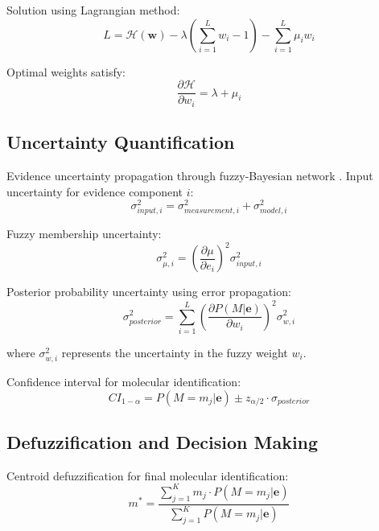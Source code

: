 \documentclass[12pt,a4paper]{article}
\begin{document}
Solution using Lagrangian method:
\begin{equation}
L = \mathcal{H}(\mathbf{w}) - \lambda \left(\sum_{i=1}^L w_i - 1\right) - \sum_{i=1}^L \mu_i w_i
\end{equation}

Optimal weights satisfy:
\begin{equation}
\frac{\partial \mathcal{H}}{\partial w_i} = \lambda + \mu_i
\end{equation}

\subsection{Uncertainty Quantification}

Evidence uncertainty propagation through fuzzy-Bayesian network \cite{klir1995fuzzy}. Input uncertainty for evidence component $i$:
\begin{equation}
\sigma_{input,i}^2 = \sigma_{measurement,i}^2 + \sigma_{model,i}^2
\end{equation}

Fuzzy membership uncertainty:
\begin{equation}
\sigma_{\mu,i}^2 = \left(\frac{\partial \mu}{\partial e_i}\right)^2 \sigma_{input,i}^2
\end{equation}

Posterior probability uncertainty using error propagation:
\begin{equation}
\sigma_{posterior}^2 = \sum_{i=1}^L \left(\frac{\partial P(M|\mathbf{e})}{\partial w_i}\right)^2 \sigma_{w,i}^2
\end{equation}

where $\sigma_{w,i}^2$ represents the uncertainty in the fuzzy weight $w_i$.

Confidence interval for molecular identification:
\begin{equation}
CI_{1-\alpha} = P(M = m_j | \mathbf{e}) \pm z_{\alpha/2} \cdot \sigma_{posterior}
\end{equation}

\subsection{Defuzzification and Decision Making}

Centroid defuzzification for final molecular identification:
\begin{equation}
m^* = \frac{\sum_{j=1}^K m_j \cdot P(M = m_j | \mathbf{e})}{\sum_{j=1}^K P(M = m_j | \mathbf{e})}
\end{equation}
\end{document}
